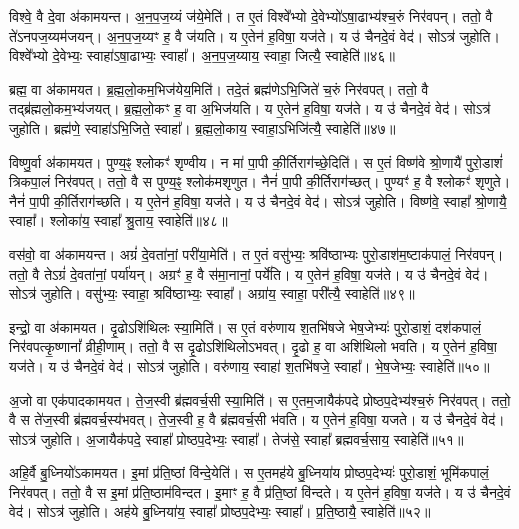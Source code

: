 विश्वे॒ वै दे॒वा अ॑कामयन्त।
अ॒न॒प॒ज॒य्यं ज॑ये॒मेति॑।
त ए॒तं विश्वे᳚भ्यो दे॒वेभ्यो॑\-ऽषा॒ढाभ्य॑श्च॒रुं निर॑वपन्।
ततो॒ वै ते॑\-ऽनपज॒य्यम॑जयन्।
अ॒न॒प॒ज॒य्यꣳ ह॒ वै ज॑यति।
य ए॒तेन॑ ह॒विषा॒ यज॑ते।
य उ॑ चैनदे॒वं वेद॑।
सोऽत्र॑ जुहोति।
विश्वे᳚भ्यो दे॒वेभ्यः॒ स्वाहा॑\-ऽषा॒ढाभ्यः॒ स्वाहा᳚।
अ॒न॒प॒ज॒य्याय॒ स्वाहा॒ जित्यै॒ स्वाहेति॑॥४६॥

ब्रह्म॒ वा अ॑कामयत।
ब्र॒ह्म॒लो॒कम॒भिज॑येय॒मिति॑।
तदे॒तं ब्रह्म॑णे\-ऽभि॒जिते॑ च॒रुं निर॑वपत्।
ततो॒ वै तद्ब्र॑ह्मलो॒कम॒भ्य॑जयत्।
ब्र॒ह्म॒लो॒कꣳ ह॒ वा अ॒भिज॑यति।
य ए॒तेन॑ ह॒विषा॒ यज॑ते।
य उ॑ चैनदे॒वं वेद॑।
सोऽत्र॑ जुहोति।
ब्रह्म॑णे॒ स्वाहा॑\-ऽभि॒जिते॒ स्वाहा᳚।
ब्र॒ह्म॒लो॒काय॒ स्वाहा॒\-ऽभिजि॑त्यै॒ स्वाहेति॑॥४७॥

विष्णु॒र्वा अ॑कामयत।
पुण्य॒ꣴ॒ श्लोकꣳ॑ शृण्वीय।
न मा॑ पा॒पी की॒र्तिराग॑च्छे॒दिति॑।
स ए॒तं विष्ण॑वे श्रो॒णायै॑ पुरो॒डाशं॑ त्रिकपा॒लं निर॑वपत्।
ततो॒ वै स पुण्य॒ꣴ॒ श्लोक॑मशृणुत।
नैनं॑ पा॒पी की॒र्तिराग॑च्छत्।
पुण्यꣳ॑ ह॒ वै श्लोकꣳ॑ शृणुते।
नैनं॑ पा॒पी की॒र्तिराग॑च्छति।
य ए॒तेन॑ ह॒विषा॒ यज॑ते।
य उ॑ चैनदे॒वं वेद॑।
सोऽत्र॑ जुहोति।
विष्ण॑वे॒ स्वाहा᳚ श्रो॒णायै॒ स्वाहा᳚।
श्लोका॑य॒ स्वाहा᳚ श्रु॒ताय॒ स्वाहेति॑॥४८॥

वस॑वो॒ वा अ॑कामयन्त।
अग्रं॑ दे॒वता॑नां॒ परी॑या॒मेति॑।
त ए॒तं वसु॑भ्यः॒ श्रवि॑ष्ठाभ्यः पुरो॒डाश॑म॒ष्टा\-क॑पालं॒ निर॑वपन्।
ततो॒ वै तेऽग्रं॑ दे॒वता॑नां॒ पर्या॑यन्।
अग्रꣳ॑ ह॒ वै स॑मा॒नानां॒ पर्ये॑ति।
य ए॒तेन॑ ह॒विषा॒ यज॑ते।
य उ॑ चैनदे॒वं वेद॑।
सोऽत्र॑ जुहोति।
वसु॑भ्यः॒ स्वाहा॒ श्रवि॑ष्ठाभ्यः॒ स्वाहा᳚।
अग्रा॑य॒ स्वाहा॒ परी᳚त्यै॒ स्वाहेति॑॥४९॥

इन्द्रो॒ वा अ॑कामयत।
दृ॒ढो\-ऽशि॑थिलः स्या॒मिति॑।
स ए॒तं वरु॑णाय श॒तभि॑षजे भेष॒जेभ्यः॑ पुरो॒डाशं॒ दश॑कपालं॒ निर॑वपत्कृ॒ष्णानां᳚ व्रीही॒णाम्।
ततो॒ वै स दृ॒ढो\-ऽशि॑थिलो\-ऽभवत्।
दृ॒ढो ह॒ वा अशि॑थिलो भवति।
य ए॒तेन॑ ह॒विषा॒ यज॑ते।
य उ॑ चैनदे॒वं वेद॑।
सोऽत्र॑ जुहोति।
वरु॑णाय॒ स्वाहा॑ श॒तभि॑षजे॒ स्वाहा᳚।
भे॒ष॒जेभ्यः॒ स्वाहेति॑॥५०॥

अ॒जो वा एक॑पादकामयत।
ते॒ज॒स्वी ब्र॑ह्म\-वर्च॒सी स्या॒मिति॑।
स ए॒तम॒जायैक॑पदे प्रोष्ठप॒देभ्य॑श्च॒रुं निर॑वपत्।
ततो॒ वै स ते॑ज॒स्वी ब्र॑ह्म\-वर्च॒स्य॑भवत्।
ते॒ज॒स्वी ह॒ वै ब्र॑ह्म\-वर्च॒सी भ॑वति।
य ए॒तेन॑ ह॒विषा॒ यजते।
य उ॑ चैनदे॒वं वेद॑।
सोऽत्र॑ जुहोति।
अ॒जायैक॑पदे॒ स्वाहा᳚ प्रोष्ठप॒देभ्यः॒ स्वाहा᳚।
तेज॑से॒ स्वाहा᳚ ब्रह्मवर्च॒साय॒ स्वाहेति॑॥५१॥

अहि॒र्वै बु॒ध्नियो॑\-ऽकामयत।
इ॒मां प्र॑ति॒ष्ठां वि॑न्दे॒येति॑।
स ए॒तमह॑ये बु॒ध्निया॑य प्रोष्ठप॒देभ्यः॑ पुरो॒डाशं॒ भूमि॑कपालं॒ निर॑वपत्।
ततो॒ वै स इ॒मां प्र॑ति॒ष्ठाम॑विन्दत।
इ॒माꣳ ह॒ वै प्र॑ति॒ष्ठां वि॑न्दते।
य ए॒तेन॑ ह॒विषा॒ यज॑ते।
य उ॑ चैनदे॒वं वेद॑।
सोऽत्र॑ जुहोति।
अह॑ये बु॒ध्निया॑य॒ स्वाहा᳚ प्रोष्ठप॒देभ्यः॒ स्वाहा᳚।
प्र॒ति॒ष्ठायै॒ स्वाहेति॑॥५२॥

